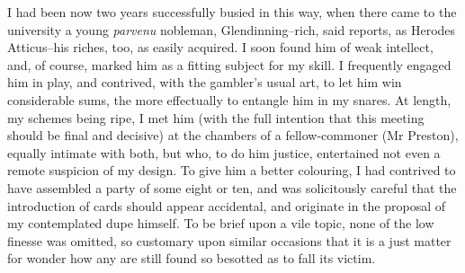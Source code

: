 \documentclass[12pt]{article}
\begin{document}
     I had been now two years successfully busied in this way, when
there came to the university a young \emph{parvenu} nobleman,
Glendinning--rich, said reports, as Herodes Atticus--his riches,
too, as easily acquired.  I soon found him of weak intellect, and,
of course, marked him as a fitting subject for my skill.  I
frequently engaged him in play, and contrived, with the gambler's
usual art, to let him win considerable sums, the more effectually
to entangle him in my snares.  At length, my schemes being ripe, I
met him (with the full intention that this meeting should be final
and decisive) at the chambers of a fellow-commoner (Mr Preston),
equally intimate with both, but who, to do him justice, entertained
not even a remote suspicion of my design.  To give him a better
colouring, I had contrived to have assembled a party of some eight
or ten, and was solicitously careful that the introduction of cards
should appear accidental, and originate in the proposal of my
contemplated dupe himself.  To be brief upon a vile topic, none of
the low finesse was omitted, so customary upon similar occasions
that it is a just matter for wonder how any are still found so
besotted as to fall its victim.
\end{document}
